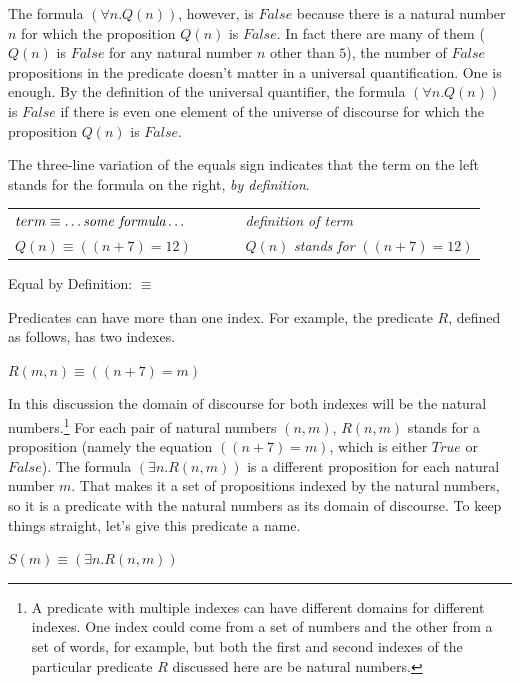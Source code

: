 {The formula $(\forall n.Q(n))$, however, is $False$
because there is a natural number $n$ for which
the proposition $Q(n)$ is $False$.
In fact there are many of them
($Q(n)$ is $False$ for any natural number $n$ other than $5$),
the number of $False$ propositions in the predicate doesn't matter
in a universal quantification. One is enough.
By the definition of
the universal quantifier, the formula $(\forall n.Q(n))$
is $False$ if there is even one element of the
universe of discourse for which the proposition
$Q(n)$ is $False$.

\begin{aside}
The three-line variation of the equals sign
indicates that the term on the left stands
for the formula on the right, \emph{by definition}.
\begin{center}
\begin{tabular}{ll}
$term \equiv \dots \emph{some formula} \dots$ & ~~~~~ \emph{definition of term} \\
$Q(n) \equiv ((n + 7) = 12)$                  & ~~~~~ $Q(n)$ \emph{stands for} $((n + 7) = 12)$ \\
\end{tabular}
\end{center}
\caption{Equal by Definition: $\equiv$}
\label{aside:ch02-three-line-equal}
\end{aside}

Predicates can have more than one index.
For example, the predicate $R$, 
defined as follows, has two indexes.
\begin{center}
$R(m, n) \equiv ((n + 7) = m)$
\end{center}
In this discussion the domain of discourse
for both indexes will be the natural numbers.\footnote{A
predicate with multiple indexes can
have different domains for different indexes.
One index could come from a set of numbers
and the other from a set of words, for example,
but both the first and second indexes
of the particular predicate $R$ discussed here
are be natural numbers.}
For each pair of natural numbers $(n, m)$,
$R(n, m)$ stands for a proposition (namely the
equation $((n + 7) = m)$, which is either $True$ or $False$).
The formula $(\exists n.R(n,m))$ is a different
proposition for each natural number $m$.
That makes it a set of propositions indexed by the natural numbers,
so it is a predicate with the natural numbers as its domain of discourse.
To keep things straight, let's give this predicate a name.
\begin{center}
$S(m) \equiv (\exists n.R(n,m))$
\end{center}

}
